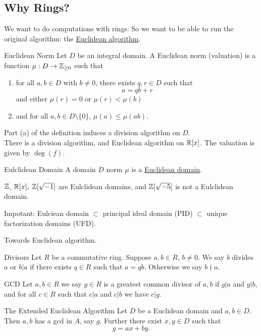 \documentclass[twoside, openright, fontsize=10pt, headings=big]{scrbook}
\begin{document}
\subsection*{Why Rings?}
We want to do computations with rings. So we want to be able to run the original algorithm: the \underline{Euclidean algorithm}.
\begin{definition}{Euclidean Norm}{}
    Let $D$ be an integral domain. A Euclidean norm (valuation) is a function $\mu:D\to\mathbb{Z}_{\geq0}$ such that 
    \begin{enumerate}[label=(\alph*)]
        \item for all $a,b\in D$ with $b\neq0$, there exists $q,r\in D$ such that
        \[
            a=qb+r
        \]
        and either $\mu(r)=0$ or $\mu(r)<\mu(b)$
        \item and for all $a,b\in D\setminus\{0\}$, $\mu(a)\leq\mu(ab)$.
    \end{enumerate}
\end{definition}
Part (a) of the definition induces a division algorithm on $D$.\\
There is a division algorithm, and Euclidean algorithm on $\mathbb{R}[x]$. The valuation is given by $\deg(f)$.
\begin{theorem}{Eulclidean Domain}{}
    A domain $D$ norm $\mu$ is a \underline{Euclidean domain}.
\end{theorem}
\begin{example}{}{}
    $\mathbb{Z}$, $\mathbb{R}[x],$ $\mathbb{Z}[\sqrt{-1}]$ are Eulclidean domains, and $\mathbb{Z}[\sqrt{-5}]$ is not a Eulclidean domain.    
\end{example}
\begin{important}
    Impotant: Eulciean domain $\subset$ principal ideal domain (PID) $\subset$ unique factorization domains (UFD).
\end{important}
Towards Euclidean algorithm.
\begin{definition}{Divisors}{}
    Let $R$ be a commutative ring. Suppose $a,b\in R$, $b\neq0$. We say $b$ divides $a$ or $b\vert a$ if there exists $q\in R$ such that $a=qb$. Otherwise we say $b\nmid a$.
\end{definition}
\begin{theorem}{GCD}{}
    Let $a,b\in R$ we say $g\in R$ is a greatest common divisor of $a,b$ if $g\vert a$ and $g\vert b$, and for all $c\in R$ such that $c\vert a$ and $c\vert b$ we have $c\vert g$.
\end{theorem}
\begin{theorem}{The Extended Euclidean Algorithm}{}
    Let $D$ be a Euclidean domain and $a,b\in D$. Then $a,b$ has a gcd in $A$, say $g$. Further there exist $x,y\in D$ such that 
    \[
        g=ax+by.
    \]
\end{theorem}
\end{document}
